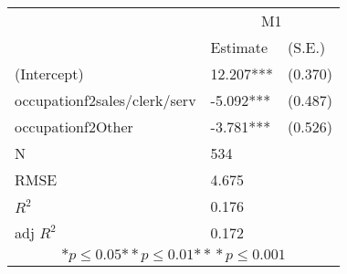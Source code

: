 \begin{tabular}{*{3}{l}}
\hline
                  & \multicolumn{2}{c}{M1}   \tabularnewline
                   &Estimate  &(S.E.)  \tabularnewline
 \hline
 \hline
   (Intercept)     &12.207***   &   (0.370) \tabularnewline
   occupationf2sales/clerk/serv    &-5.092***   &   (0.487) \tabularnewline
   occupationf2Other    &-3.781***   &   (0.526) \tabularnewline
 \hline
 N                 &534       &        \tabularnewline
 RMSE             &4.675         & \tabularnewline
 $R^2$             &0.176         & \tabularnewline
 adj $R^2$         &0.172         & \tabularnewline
 \hline
\hline
 
 \multicolumn{3}{c}{${*  p}\le 0.05$${*\!\!*  p}\le 0.01$${*\!\!*\!\!*  p}\le 0.001$}\tabularnewline
 \end{tabular}